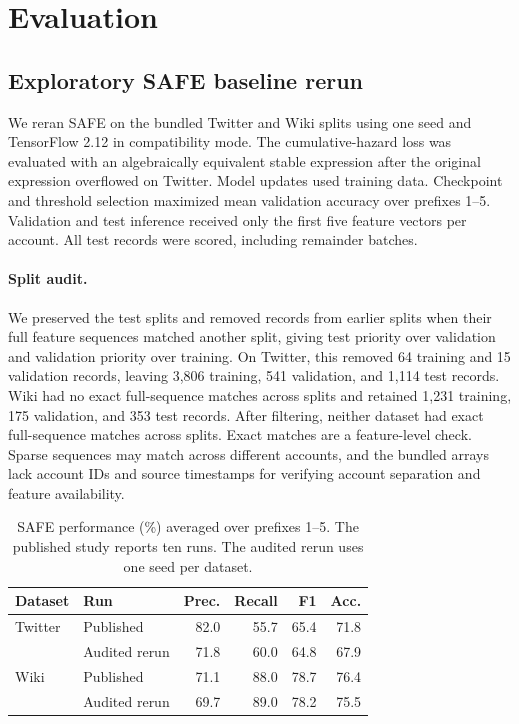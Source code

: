 \section{Evaluation}
\subsection{Exploratory SAFE baseline rerun}
We reran SAFE on the bundled Twitter and Wiki splits using one seed
and TensorFlow 2.12 in compatibility mode. The cumulative-hazard loss
was evaluated with an algebraically equivalent stable expression
after the original expression overflowed on Twitter. Model updates
used training data. Checkpoint and threshold selection maximized mean
validation accuracy over prefixes 1--5. Validation and test inference
received only the first five feature vectors per account. All test
records were scored, including remainder batches.

\paragraph{Split audit.}
We preserved the test splits and removed records from earlier splits
when their full feature sequences matched another split, giving test
priority over validation and validation priority over training.
On Twitter, this removed 64 training and 15 validation records,
leaving 3,806 training, 541 validation, and 1,114 test records.
Wiki had no exact full-sequence matches across splits and retained
1,231 training, 175 validation, and 353 test records. After filtering,
neither dataset had exact full-sequence matches across splits.
Exact matches are a feature-level check. Sparse sequences may match
across different accounts, and the bundled arrays lack account IDs and
source timestamps for verifying account separation and feature availability.

\begin{table}[t]
\centering
\small
\setlength{\tabcolsep}{4pt}
\begin{tabular}{llrrrr}
\hline
Dataset & Run & Prec. & Recall & F1 & Acc. \\
\hline
Twitter & Published & 82.0 & 55.7 & 65.4 & 71.8 \\
        & Audited rerun & 71.8 & 60.0 & 64.8 & 67.9 \\
Wiki    & Published & 71.1 & 88.0 & 78.7 & 76.4 \\
        & Audited rerun & 69.7 & 89.0 & 78.2 & 75.5 \\
\hline
\end{tabular}
\caption{SAFE performance (\%) averaged over prefixes 1--5.
The published study reports ten runs. The audited rerun uses one
seed per dataset.}
\label{tab:safe-audited-rerun}
\end{table}

